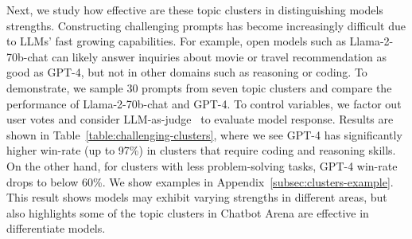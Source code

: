 \documentclass{article}
\newcommand{\showcomments}{yes}
\newcommand{\system}{Chatbot Arena\xspace}
\newcommand\weilin[1]{\ifthenelse{\equal{\showcomments}{yes}}{{\color{cyan} Wei-Lin: #1}}{\ignorespaces}}
\begin{document}
Next, we study how effective are these topic clusters in distinguishing models strengths.
Constructing challenging prompts has become increasingly difficult due to LLMs' fast growing capabilities. For example, open models such as Llama-2-70b-chat can likely answer inquiries about movie or travel recommendation as good as GPT-4, but not in other domains such as reasoning or coding. To demonstrate, we sample 30 prompts from seven topic clusters and compare the performance of Llama-2-70b-chat and GPT-4.
To control variables, we factor out user votes and consider LLM-as-judge~\cite{zheng2023judging} to evaluate model response.
Results are shown in Table~\ref{table:challenging-clusters}, where we see GPT-4 has significantly higher win-rate (up to 97\%) in clusters that require coding and reasoning skills. On the other hand, for clusters with less problem-solving tasks, GPT-4 win-rate drops to below 60\%. We show examples in Appendix~\ref{subsec:clusters-example}.
This result shows models may exhibit varying strengths in different areas, but also highlights some of the topic clusters in \system are effective in differentiate models.

\end{document}
